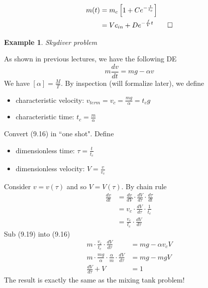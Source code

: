 \documentclass{report}
\newtheorem{ex}{Example}[section]
\begin{document}
\begin{align*}
m(t) &= m_c\left[1 + Ce^{-\frac{t}{t_c}}\right] \\
&= Vc_{in} + De^{-\frac{f}{V}t} \qed
\end{align*}
\begin{ex}
Skydiver problem
\end{ex}
As shown in previous lectures, we have the following DE
\begin{equation}
m\frac{dv}{dt} = mg - \alpha v
\end{equation}
We have $[\alpha] = \frac{M}{T}$. By inspection (will formalize later), we define
\begin{itemize}
\item characteristic velocity: $v_{term} = v_c = \frac{mg}{\alpha} = t_cg$
\item characteristic time: $t_c = \frac{m}{\alpha}$
\end{itemize}
Convert (9.16) in ``one shot". Define
\begin{itemize}
\item dimensionless time: $\tau = \frac{t}{t_c}$
\item dimensionless velocity: $V = \frac{v}{v_c}$
\end{itemize}
Consider $v = v(\tau)$ and so $V = V(\tau)$. By chain rule
\begin{align}
\frac{dv}{dt} &= \frac{dv}{dV} \cdot \frac{dV}{d\tau}\cdot\frac{d\tau}{dt} \\
&= v_c\cdot \frac{dV}{d\tau}\cdot\frac{1}{t_c} \\
&= \frac{v_c}{t_c} \cdot \frac{dV}{d\tau}
\end{align}
Sub (9.19) into (9.16)
\begin{align}
m\cdot \frac{v_c}{t_c}\cdot \frac{dV}{d\tau} &= mg - \alpha v_cV \\
m\cdot \frac{mg}{\alpha}\cdot \frac{\alpha}{m}\cdot \frac{dV}{d\tau} &= mg - mgV \\
\frac{dV}{d\tau} + V &= 1
\end{align}
The result is exactly the same as the mixing tank problem!
\end{document}
